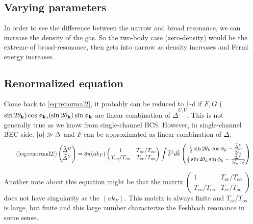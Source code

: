 \subsection{Varying parameters}
In order to see the difference between the narrow and broad resonance,  we can increase the density of the gas.  So the two-body case (zero-density) would be the extreme of broad-resonance, then gets into narrow as density increases and Fermi energy increases.  

\subsection{Renormalized equation}
Come back to \ref{eq:renormal2}, it probably can be reduced to 1-d if $F,G$ ($\sin2\theta_{\mathbf{k}})\cos\phi_{\mathbf{k}}$,$(\sin2\theta_{\mathbf{k}})\sin\phi_{\mathbf{k}}$  are linear combination of $\widetilde\Delta^{U,V}$.  This is not generally true as we know from single-channel BCS.  However,   in single-channel BEC side,   $\lvert{\mu}\rvert\gg\Delta$ and $F$ can be approximated as linear combination of $\Delta$.  
\begin{equation}\tag{\ref{eq:renormal2}}
\begin{pmatrix}\widetilde\Delta^U\\\widetilde\Delta^V\end{pmatrix}=
8\pi({a}{k_F})\begin{pmatrix}1&T_{oc}/T_{oo}\\T_{co}/T_{oo}&T_{cc}/T_{oo}\end{pmatrix}
\int\widetilde{k}^2d\widetilde{k}
\begin{pmatrix}
\nth{2}\sin2\theta_{k}\cos\phi_k-\frac{\widetilde\Delta^U}{2\widetilde\epsilon_k}\\
\nth{2}\sin2\theta_{k}\sin\phi_k-\frac{\widetilde\Delta^V}{2\widetilde\epsilon_k+\widetilde{\eta}}
\end{pmatrix}
\end{equation}

Another note about this equation might be that the matrix $\begin{pmatrix}1&T_{oc}/T_{oo}\\T_{co}/T_{oo}&T_{cc}/T_{oo}\end{pmatrix}$ does not have singularity as the $(ak_{F})$.  This matrix is always finite and $T_{cc}/T_{oo}$ is large, but finite and this large number characterize the Feshbach resonance in some sense.  
